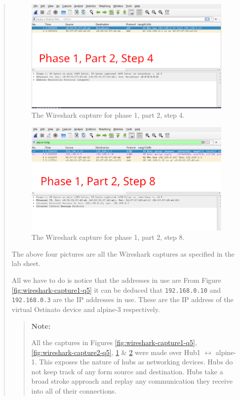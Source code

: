 \documentclass{article}
\newenvironment{ans}
   {\fbox{Answer}\begin{quote}\nopagebreak}
   {\end{quote}}
\newenvironment{note}{%
    \begin{quote}
    \begin{tcolorbox}[colback=gray!10,arc=0mm,boxrule=0pt]
    \textbf{Note:}%
}{%
	\end{tcolorbox}
    \end{quote}%
}
\begin{document}
\begin{ans}
\begin{figure}[H]
\centering
\includegraphics[width=14cm]{data/q5-capture3.png}
\caption{The Wireshark capture for phase 1, part 2, step 4.}
\label{fig:wireshark-capture3-q5}
\end{figure}

\begin{figure}[H]
\centering
\includegraphics[width=14cm]{data/q5-capture4.png}
\caption{The Wireshark capture for phase 1, part 2, step 8.}
\label{fig:wireshark-capture4-q5}
\end{figure}

The above four pictures are all the Wireshark captures as
specified in the lab sheet.

All we have to do is notice that the addresses in use are
From Figure \ref{fig:wireshark-capture1-q5} it can be
deduced that \texttt{192.168.0.10} and \texttt{192.168.0.3}
are the IP addresses in use. These are the IP address of
the virtual Ostinato device and alpine-3 respectively.

\begin{note}
All the captures in Figures
\ref{fig:wireshark-capture1-q5},
\ref{fig:wireshark-capture2-q5},
\ref{fig:wireshark-capture3-q5} \&
\ref{fig:wireshark-capture4-q5} were made over
Hub1 $\leftrightarrow$ alpine-1. This exposes
the nature of hubs as networking devices. Hubs
do not keep track of any form source and
destination. Hubs take a broad stroke approach
and replay any communication they receive into
all of their connections.
\end{note}
\end{ans}
\end{document}
